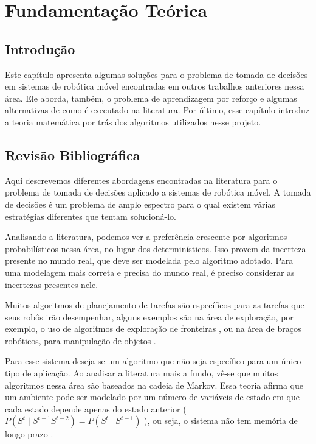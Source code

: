 
\chapter{Fundamentação Teórica} \label{chap:FundamentacaoMatematica}



\section{Introdução}

Este capítulo apresenta algumas soluções para o problema de tomada de decisões em sistemas de robótica móvel encontradas em outros trabalhos anteriores nessa área. Ele aborda, também, o problema de aprendizagem por reforço e algumas alternativas de como é executado na literatura. Por último, esse capítulo introduz a teoria matemática por trás dos algoritmos utilizados nesse projeto.


\section{Revisão Bibliográfica} \label{section:RevisaoBibliografica}

Aqui descrevemos diferentes abordagens encontradas na literatura para o problema de tomada de decisões aplicado a sistemas de robótica móvel. A tomada de decisões é um problema de amplo espectro para o qual existem várias estratégias diferentes que tentam solucioná-lo.

Analisando a literatura, podemos ver a preferência crescente por algoritmos probabilísticos nessa área, no lugar dos determinísticos. Isso provem da incerteza presente no mundo real, que deve ser modelada pelo algoritmo adotado. Para uma modelagem mais correta e precisa do mundo real, é preciso considerar as incertezas presentes nele.

Muitos algoritmos de planejamento de tarefas são específicos para as tarefas que seus robôs irão desempenhar, alguns exemplos são na área de exploração, por exemplo, o uso de algoritmos de exploração de fronteiras \cite{conf:icra:FredaO05,Yamauchi:1998:FEU,Yamauchi:1997:FAA}, ou na área de braços robóticos, para manipulação de objetos \cite{Berenson_2009_6465}.

Para esse sistema deseja-se um algoritmo que não seja específico para um único tipo de aplicação. Ao analisar a literatura mais a fundo, vê-se que muitos algoritmos nessa área são baseados na cadeia de Markov. Essa teoria afirma que um ambiente pode ser modelado por um número de variáveis de estado em que cada estado depende apenas do estado anterior ( $ P(S^t\mid S^{t-1}S^{t-2})=P(S^t\mid S^{t-1}) $ ), ou seja, o sistema não tem memória de longo prazo \cite{books:daglib:0095301}.

